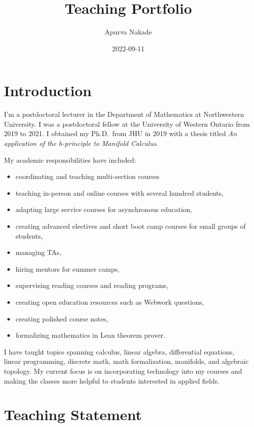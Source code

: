 \documentclass[
]{report}
\title{Teaching Portfolio}
\author{Apurva Nakade}
\date{2022-09-11}
\providecommand{\tightlist}{%
  \setlength{\itemsep}{0pt}\setlength{\parskip}{0pt}}
\begin{document}
\maketitle

\thispagestyle{empty}

{
\setcounter{tocdepth}{2}
\tableofcontents
}
\hypertarget{introduction}{%
\chapter*{Introduction}\label{introduction}}


I'm a postdoctoral lecturer in the Department of Mathematics at Northwestern
University. I was a postdoctoral fellow at the University of Western
Ontario from 2019 to 2021. I obtained my Ph.D.~from JHU in 2019 with a thesis titled \emph{An application of
the h-principle to Manifold Calculus}.

My academic responsibilities have included:

\begin{itemize}
\tightlist
\item
  coordinating and teaching multi-section courses
\item
  teaching in-person and online courses with several hundred students,
\item
  adapting large service courses for asynchronous education,
\item
  creating advanced electives and short boot camp courses for small groups of students,
\item
  managing TAs,
\item
  hiring mentors for summer camps,
\item
  supervising reading courses and reading programs,
\item
  creating open education resources such as Webwork questions,
\item
  creating polished course notes,
\item
  formalizing mathematics in Lean theorem prover.
\end{itemize}

I have taught topics spanning calculus, linear algebra, differential equations, linear programming, discrete math, math formalization, manifolds, and algebraic topology.
My current focus is on incorporating technology into my courses and making the classes more helpful to students interested in applied fields.

\hypertarget{teaching-statement}{%
\chapter{Teaching Statement}\label{teaching-statement}}
\end{document}
